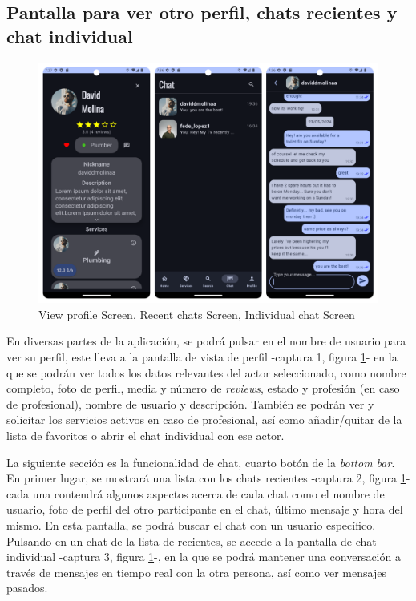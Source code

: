 \subsection{Pantalla para ver otro perfil, chats recientes y chat individual}
\begin{figure}[h]
	\centering
	\includegraphics[width = 1\textwidth]{Imagenes/capturasApp/seeProfile_recent_chat.png}
	\caption{View profile Screen, Recent chats Screen, Individual chat Screen}
	\label{fig:capApp4}
\end{figure}

En diversas partes de la aplicación, se podrá pulsar en el  nombre de usuario para ver su perfil, este lleva a la pantalla de  vista de perfil -captura 1, figura \ref{fig:capApp4}- en la que se podrán ver todos los datos relevantes del actor seleccionado, como nombre completo, foto de perfil, media y número de \textit{reviews}, estado y profesión (en caso de profesional), nombre de usuario y descripción. También se podrán ver y solicitar los servicios activos en caso de profesional, así como añadir/quitar de la lista de favoritos o abrir el chat individual con ese actor. 

La siguiente sección es la funcionalidad de chat, cuarto botón de la \textit{bottom bar}. En primer lugar, se mostrará una lista con los chats recientes -captura 2, figura \ref{fig:capApp4}- cada una contendrá algunos aspectos acerca de cada chat como el nombre de usuario, foto de perfil del otro participante en el chat, último mensaje y hora del mismo. En esta pantalla, se podrá buscar el chat con un usuario específico. Pulsando en un chat de la lista de recientes, se accede a la pantalla de chat individual -captura 3, figura \ref{fig:capApp4}-, en la que se podrá mantener una conversación a través de mensajes en tiempo real con la otra persona, así como ver mensajes pasados.
\newpage
